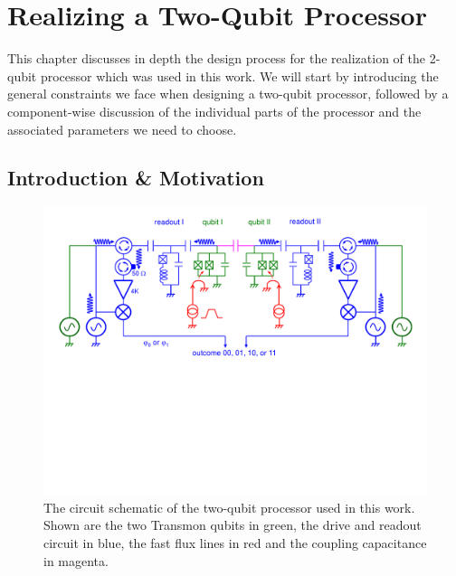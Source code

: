 
\chapter{Realizing a Two-Qubit Processor}

This chapter discusses in depth the design process for the realization of the 2-qubit processor which was used in this work. We will start by introducing the general constraints we face when designing a two-qubit processor, followed by a component-wise discussion of the individual parts of the processor and the associated parameters we need to choose.

\section{Introduction \& Motivation}

\begin{figure}[ht!]
  \centering
	\includegraphics[width=1.\textwidth]{"./material/figures/2-qubit-processor/processor schematic"}
	\caption[Circuit schematic of the two-qubit processor]{The circuit schematic of the two-qubit processor used in this work. Shown are the two Transmon qubits in green, the drive and readout circuit in blue, the fast flux lines in red and the coupling capacitance in magenta.}
	\label{fig:2_qubit_chip_circuit_diagram}
\end{figure}

